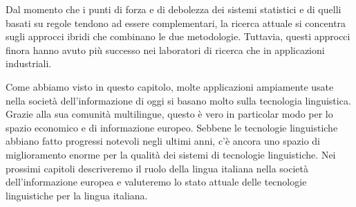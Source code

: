 \documentclass[]{../../metanetpaper}
\begin{document}
\begin{multicols}{2}
Dal momento che i punti di forza e di debolezza dei sistemi statistici e di
quelli basati su regole tendono ad essere complementari, la ricerca attuale si
concentra sugli approcci ibridi che combinano le due metodologie. Tuttavia,
questi approcci finora hanno avuto pi\`{u} successo nei laboratori di ricerca
che in applicazioni industriali.


Come abbiamo visto in questo capitolo, molte applicazioni ampiamente usate
nella societ\`{a} dell'informazione di oggi si basano molto sulla tecnologia
linguistica. Grazie alla sua comunit\`{a} multilingue, questo \`{e} vero in
particolar modo per lo spazio economico e di informazione europeo. Sebbene le
tecnologie linguistiche abbiano fatto progressi notevoli negli ultimi anni,
c'\`{e} ancora uno spazio di miglioramento enorme per la qualit\`{a} dei
sistemi di tecnologie linguistiche. Nei prossimi capitoli descriveremo il
ruolo della lingua italiana nella societ\`{a} dell'informazione europea e
valuteremo lo stato attuale delle tecnologie linguistiche per la lingua
italiana.

\end{multicols}

\clearpage




\end{document}
